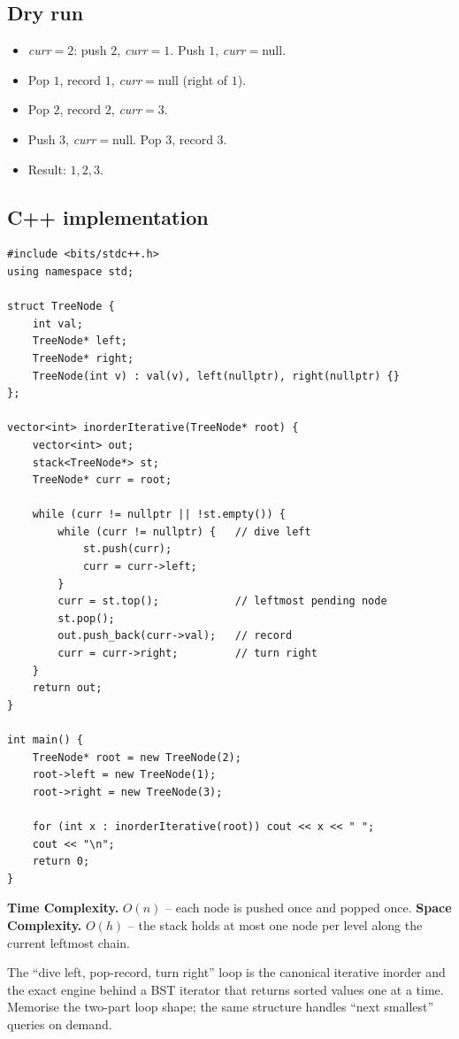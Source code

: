 \subsection*{Dry run}


\begin{itemize}
  \item \textit{curr}$=2$: push $2$, \textit{curr}$=1$. Push $1$,
        \textit{curr}$=$null.
  \item Pop $1$, record $1$, \textit{curr}$=$null (right of $1$).
  \item Pop $2$, record $2$, \textit{curr}$=3$.
  \item Push $3$, \textit{curr}$=$null. Pop $3$, record $3$.
  \item Result: $1,2,3$.
\end{itemize}

\subsection*{C++ implementation}

\begin{lstlisting}
#include <bits/stdc++.h>
using namespace std;

struct TreeNode {
    int val;
    TreeNode* left;
    TreeNode* right;
    TreeNode(int v) : val(v), left(nullptr), right(nullptr) {}
};

vector<int> inorderIterative(TreeNode* root) {
    vector<int> out;
    stack<TreeNode*> st;
    TreeNode* curr = root;

    while (curr != nullptr || !st.empty()) {
        while (curr != nullptr) {   // dive left
            st.push(curr);
            curr = curr->left;
        }
        curr = st.top();            // leftmost pending node
        st.pop();
        out.push_back(curr->val);   // record
        curr = curr->right;         // turn right
    }
    return out;
}

int main() {
    TreeNode* root = new TreeNode(2);
    root->left = new TreeNode(1);
    root->right = new TreeNode(3);

    for (int x : inorderIterative(root)) cout << x << " ";
    cout << "\n";
    return 0;
}
\end{lstlisting}

\begin{complexitybox}
\textbf{Time Complexity.} $O(n)$ -- each node is pushed once and popped
once. \textbf{Space Complexity.} $O(h)$ -- the stack holds at most one
node per level along the current leftmost chain.
\end{complexitybox}

\begin{takeawaybox}
The ``dive left, pop-record, turn right'' loop is the canonical iterative
inorder and the exact engine behind a BST iterator that returns sorted
values one at a time. Memorise the two-part loop shape; the same structure
handles ``next smallest'' queries on demand.
\end{takeawaybox}
